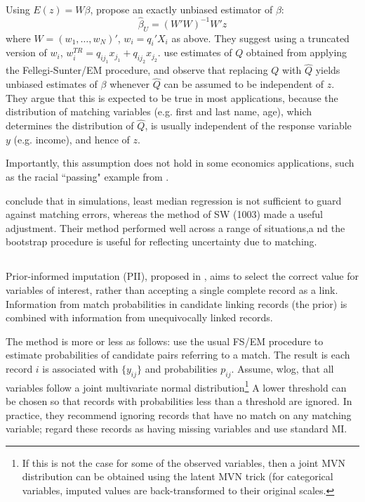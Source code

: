\documentclass[12pt]{article}
\begin{document}
Using $E(z) = W\beta$, \cite{lahiri05} propose an exactly unbiased estimator of $\beta$:
$$ \hat{\beta}_U = (W'W)^{-1} W'z$$ 
where $W = (w_1, \dots, w_N)'$, $w_i = q_i'X_i$ as above.  They suggest using a truncated version of $w_i$, $w_i^{TR} = q_{ij_1} x_{j_1} + q_{ij_2} x_{j_2}$.   \cite{lahiri05} use estimates of $Q$ obtained from applying the Fellegi-Sunter/EM procedure, and observe that replacing $Q$ with $\hat{Q}$ yields unbiased estimates of $\beta$ whenever $\hat{Q}$ can be assumed to be independent of $z$.  They argue that this is expected to be true in most applications, because the distribution of matching variables (e.g. first and last name, age), which determines the distribution of $\hat{Q}$, is usually independent of the response variable $y$ (e.g. income), and hence of $z$.  

Importantly, this assumption does not hold in some economics applications, such as the racial ``passing" example from \cite{nq2015}. 

\cite{lahiri05} conclude that in simulations, least median regression is not sufficient to guard against matching errors, whereas the method of SW (1003) made a useful adjustment.  Their method performed well across a range of situations,a nd the bootstrap procedure is useful for reflecting uncertainty due to matching.  


\subsection{\cite{Goldstein2012}}


Prior-informed imputation (PII), proposed in \cite{Goldstein2012}, aims to select the
correct value for variables of interest, rather than accepting a single complete record as a link.  Information from match probabilities in candidate linking records (the prior) is combined with information
from unequivocally linked records.  

The method is more or less as follows: use the usual FS/EM procedure to estimate probabilities of candidate pairs referring to a match.  The result is each record $i$ is associated with $\{y_{ij}\}$ and probabilities $p_{ij}$.  Assume, wlog, that all variables follow a joint multivariate normal distribution\footnote{If this is not the case for some of the observed variables, then a joint MVN distribution can be obtained using the latent MVN trick (for categorical variables, imputed values are back-transformed to their original scales.} A lower threshold can be chosen so that records with probabilities less than a threshold are ignored.  In practice, they recommend ignoring records that have no match on any matching variable; regard these records as having missing variables and use standard MI.
\end{document}
